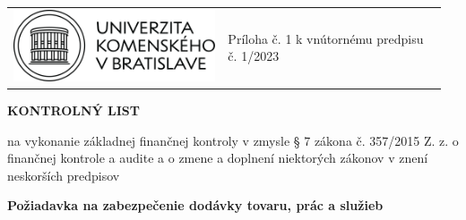 \documentclass[10pt,a4paper]{article}
\begin{document}
\begin{table}[h!]
\centering
\begin{tabular}{p{0.475\linewidth} p{0.48\linewidth}}
	\includegraphics[width=0.475\linewidth]{images/uk_logo} & \parbox[t]{\linewidth}{\raggedleft \vspace*{-3.5em} Príloha č. 1 k vnútornému predpisu č. 1/2023} \\
\end{tabular}
\end{table}

\vspace*{-1em}

{\large\bf KONTROLNÝ LIST}

na vykonanie základnej finančnej kontroly v zmysle § 7 zákona č. 357/2015 Z. z. o finančnej kontrole a audite a o zmene a doplnení niektorých zákonov v znení neskorších predpisov

\vspace*{0.5em}

{\bf Požiadavka na zabezpečenie dodávky tovaru, prác a služieb}
\vspace*{-1em}
\end{document}
